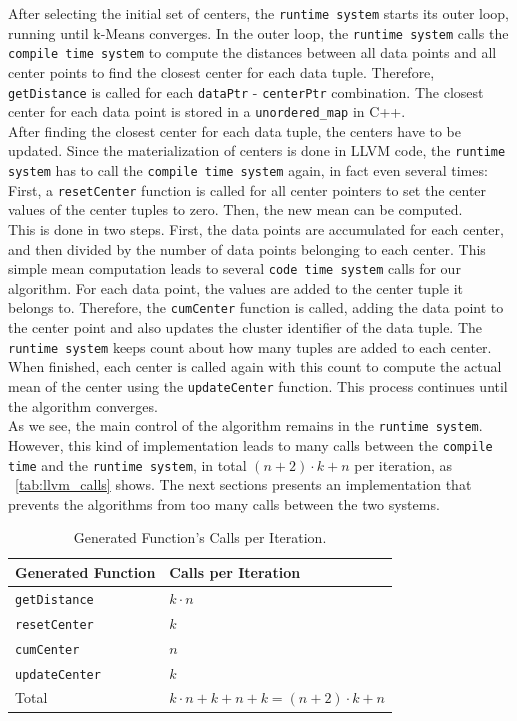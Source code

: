 After selecting the initial set of centers, the \texttt{runtime system} starts its outer loop, running until k-Means converges. In the outer loop, the \texttt{runtime system} calls the \texttt{compile time system} to compute the distances between all data points and all center points to find the closest center for each data tuple. Therefore, \texttt{getDistance} is called for each \texttt{dataPtr} - \texttt{centerPtr} combination. The closest center for each data point is stored in a \texttt{unordered\_map} in C++. 
\\
After finding the closest center for each data tuple, the centers have to be updated. Since the materialization of centers is done in LLVM code, the \texttt{runtime system} has to call the \texttt{compile time system} again, in fact even several times: First, a \texttt{resetCenter} function is called for all center pointers to set the center values of the center tuples to zero. Then, the new mean can be computed. 
\\
This is done in two steps. First, the data points are accumulated for each center, and then divided by the number of data points belonging to each center. This simple mean computation leads to several \texttt{code time system} calls for our algorithm. For each data point, the values are added to the center tuple it belongs to. Therefore, the \texttt{cumCenter} function is called, adding the data point to the center point and also updates the cluster identifier of the data tuple. The \texttt{runtime system} keeps count about how many tuples are added to each center. When finished, each center is called again with this count to compute the actual mean of the center using the \texttt{updateCenter} function. This process continues until the algorithm converges.
\\
As we see, the main control of the algorithm remains in the \texttt{runtime system}. However, this kind of implementation leads to many calls between the \texttt{compile time} and the \texttt{runtime system}, in total $(n+2) \cdot k + n$ per iteration, as ~\autoref{tab:llvm_calls} shows. The next sections presents an implementation that prevents the algorithms from too many calls between the two systems.




\begin{table}[htsb]
  \caption[LLVM number of calls]{Generated Function's Calls per Iteration.}\label{tab:llvm_calls}
  \centering
  \begin{tabular}{l l}
    \toprule
      Generated Function & Calls per Iteration \\
    \midrule
      \texttt{getDistance} & $k \cdot n$ \\
      \texttt{resetCenter} & $k$ \\
      \texttt{cumCenter} & $n$ \\
      \texttt{updateCenter} & $k$ \\
    \bottomrule
      Total & $k \cdot n + k + n + k = (n + 2) \cdot k + n$ \\
  \end{tabular}
\end{table}


